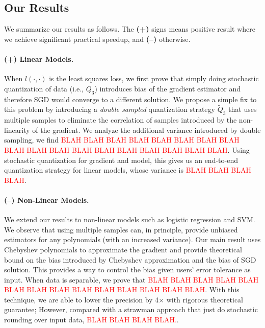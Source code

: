\documentclass{article}
\begin{document}
\subsection{Our Results}

We summarize our results as follows. The {\bf (+)}
signs means positive result where we achieve
significant practical speedup, and {\bf (--)} otherwise.

\paragraph{(+) Linear Models.} When $l(\cdot,\cdot)$ is 
the least squares loss, we first prove that
simply doing stochastic quantization of data 
(i.e., $Q_3$) introduces bias of the gradient
estimator and therefore SGD would converge
to a different solution. We propose a simple
fix to this problem by introducing a
{\em double sampled} quantization strategy
$\tilde{Q}_3$ that uses multiple samples to
eliminate the correlation of samples introduced
by the non-linearity of the gradient. We
analyze the additional variance introduced
by double sampling, we find \textcolor{red}{
BLAH BLAH BLAH BLAH BLAH BLAH BLAH BLAH BLAH BLAH BLAH BLAH
BLAH BLAH BLAH BLAH BLAH BLAH}. Using
stochastic quantization for gradient and model,
this gives us an end-to-end quantization strategy
for linear models, whose variance is \textcolor{red}{
BLAH BLAH BLAH BLAH}.

\vspace{-1em}
\paragraph{(--) Non-Linear Models.} We extend our
results to non-linear models such as
logistic regression and SVM. We observe that
using multiple samples can, in principle,
provide unbiased estimators for any polynomials
(with an increased variance). Our main
result uses Chebyshev polynomials to
approximate the gradient and provide theoretical
bound on the bias introduced by Chebyshev
approximation and the bias of SGD solution. 
This provides a way to control the bias given
users' error tolerance as input.  
When data is separable,
we prove that \textcolor{red}{BLAH BLAH 
BLAH BLAH BLAH BLAH BLAH BLAH BLAH BLAH BLAH 
BLAH BLAH BLAH}. With this technique, we are
able to lower the precision by 4$\times$ with
rigorous theoretical guarantee; However,
compared with a strawman approach that just
do stochastic rounding over input data, 
\textcolor{red}{BLAH BLAH BLAH BLAH.}.
\end{document}
